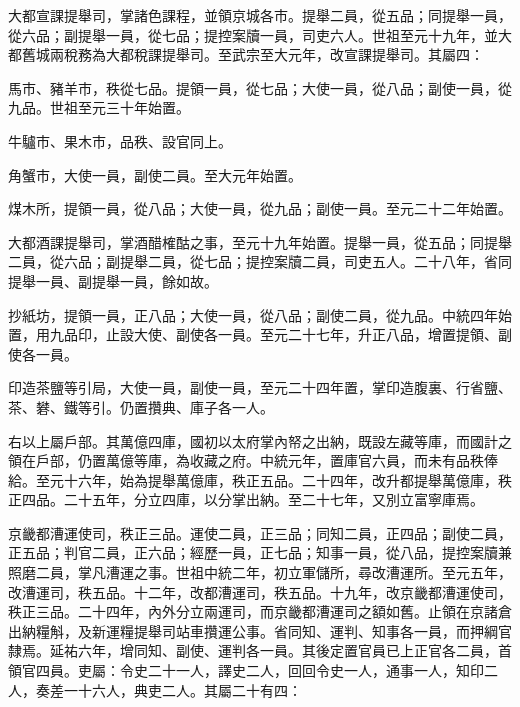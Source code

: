 \begin{pinyinscope}
 大都宣課提舉司，掌諸色課程，並領京城各市。提舉二員，從五品；同提舉一員，從六品；副提舉一員，從七品；提控案牘一員，司吏六人。世祖至元十九年，並大都舊城兩稅務為大都稅課提舉司。至武宗至大元年，改宣課提舉司。其屬四：



 馬市、豬羊市，秩從七品。提領一員，從七品；大使一員，從八品；副使一員，從九品。世祖至元三十年始置。



 牛驢市、果木市，品秩、設官同上。



 角蟹市，大使一員，副使二員。至大元年始置。



 煤木所，提領一員，從八品；大使一員，從九品；副使一員。至元二十二年始置。



 大都酒課提舉司，掌酒醋榷酤之事，至元十九年始置。提舉一員，從五品；同提舉二員，從六品；副提舉二員，從七品；提控案牘二員，司吏五人。二十八年，省同提舉一員、副提舉一員，餘如故。



 抄紙坊，提領一員，正八品；大使一員，從八品；副使二員，從九品。中統四年始置，用九品印，止設大使、副使各一員。至元二十七年，升正八品，增置提領、副使各一員。



 印造茶鹽等引局，大使一員，副使一員，至元二十四年置，掌印造腹裏、行省鹽、茶、礬、鐵等引。仍置攢典、庫子各一人。



 右以上屬戶部。其萬億四庫，國初以太府掌內帑之出納，既設左藏等庫，而國計之領在戶部，仍置萬億等庫，為收藏之府。中統元年，置庫官六員，而未有品秩俸給。至元十六年，始為提舉萬億庫，秩正五品。二十四年，改升都提舉萬億庫，秩正四品。二十五年，分立四庫，以分掌出納。至二十七年，又別立富寧庫焉。



 京畿都漕運使司，秩正三品。運使二員，正三品；同知二員，正四品；副使二員，正五品；判官二員，正六品；經歷一員，正七品；知事一員，從八品，提控案牘兼照磨二員，掌凡漕運之事。世祖中統二年，初立軍儲所，尋改漕運所。至元五年，改漕運司，秩五品。十二年，改都漕運司，秩五品。十九年，改京畿都漕運使司，秩正三品。二十四年，內外分立兩運司，而京畿都漕運司之額如舊。止領在京諸倉出納糧斛，及新運糧提舉司站車攢運公事。省同知、運判、知事各一員，而押綱官隸焉。延祐六年，增同知、副使、運判各一員。其後定置官員已上正官各二員，首領官四員。吏屬：令史二十一人，譯史二人，回回令史一人，通事一人，知印二人，奏差一十六人，典吏二人。其屬二十有四：




\end{pinyinscope}
